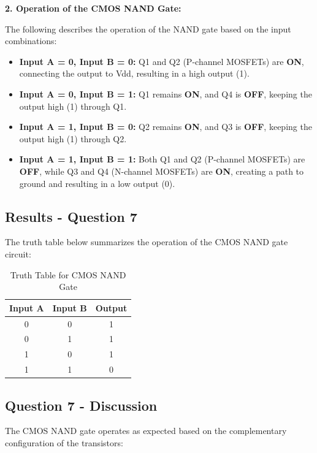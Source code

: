 \documentclass{article}
\begin{document}
    \textbf{2. Operation of the CMOS NAND Gate:}
    
    The following describes the operation of the NAND gate based on the input combinations:
    
    \begin{itemize}
        \item \textbf{Input A = 0, Input B = 0:} Q1 and Q2 (P-channel MOSFETs) are \textbf{ON}, connecting the output to Vdd, resulting in a high output (1).
        \item \textbf{Input A = 0, Input B = 1:} Q1 remains \textbf{ON}, and Q4 is \textbf{OFF}, keeping the output high (1) through Q1.
        \item \textbf{Input A = 1, Input B = 0:} Q2 remains \textbf{ON}, and Q3 is \textbf{OFF}, keeping the output high (1) through Q2.
        \item \textbf{Input A = 1, Input B = 1:} Both Q1 and Q2 (P-channel MOSFETs) are \textbf{OFF}, while Q3 and Q4 (N-channel MOSFETs) are \textbf{ON}, creating a path to ground and resulting in a low output (0).
    \end{itemize}
    
    \subsection*{\textbf{Results - Question 7}}
    The truth table below summarizes the operation of the CMOS NAND gate circuit:
    
    \begin{table}[H]
        \centering
        \caption{Truth Table for CMOS NAND Gate}
        \begin{tabular}{|c|c|c|}
            \hline
            Input A & Input B & Output \\
            \hline
            0 & 0 & 1 \\
            0 & 1 & 1 \\
            1 & 0 & 1 \\
            1 & 1 & 0 \\
            \hline
        \end{tabular}
    \end{table}
    
    \subsection*{\textbf{Question 7 - Discussion}}
    The CMOS NAND gate operates as expected based on the complementary configuration of the transistors: \\ 
    
\end{document}
